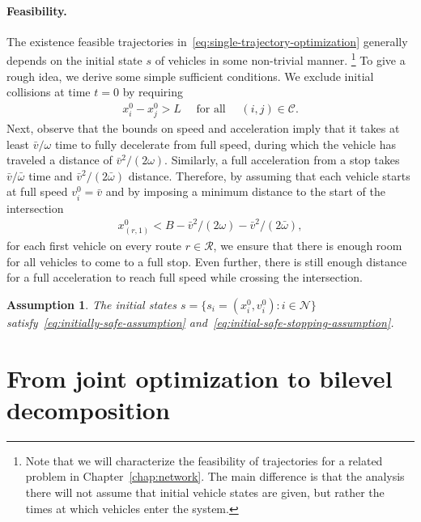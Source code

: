 \documentclass[a4paper]{report}
\theoremstyle{definition}
\theoremstyle{plain}
\newtheorem{assump}{Assumption}[chapter]
\begin{document}
\paragraph{Feasibility.}
The existence feasible trajectories in~\eqref{eq:single-trajectory-optimization} generally depends on the initial
state $s$ of vehicles in some non-trivial manner.%
\footnote{Note that we will characterize the feasibility of
  trajectories for a related problem in Chapter~\ref{chap:network}.
%
  The main difference is that the analysis there will not assume that initial
  vehicle states are given, but rather the times at which vehicles enter the
  system.}
%
To give a rough idea, we derive some simple sufficient conditions.
We exclude initial collisions at time $t=0$ by requiring
\begin{align}\label{eq:initially-safe-assumption}
 x_{i}^{0} - x_{j}^{0} > L \quad \text{ for all } \quad  (i,j) \in \mathcal{C} .
\end{align}
%
%
Next, observe that the bounds on speed and acceleration imply that it takes at
least $\bar{v}/\omega$ time to fully decelerate from full speed, during which the
vehicle has traveled a distance of $\bar{v}^2/(2\omega)$. Similarly, a full
acceleration from a stop takes $\bar{v}/\bar{\omega}$ time and
$\bar{v}^2/(2\bar{\omega})$ distance.
%
Therefore, by assuming that each vehicle starts at full speed
$v_{i}^{0} = \bar{v}$ and by imposing a minimum distance to the start of the
intersection
\begin{align}\label{eq:initial-safe-stopping-assumption}
  x_{(r,1)}^{0} < B - \bar{v}^2/(2\omega) - \bar{v}^2/(2\bar{\omega}),
\end{align}
for each first vehicle on every route
$r \in \mathcal{R}$, we ensure that there is enough room for all vehicles to
come to a full stop. Even further, there is still enough distance for a full
acceleration to reach full speed while crossing the intersection.
%

\begin{assump}\label{assump:feasible}
  The initial states $s=\{s_i = (x_i^0,v_i^0) : i \in \mathcal{N} \}$
  satisfy~\eqref{eq:initially-safe-assumption}
  and~\eqref{eq:initial-safe-stopping-assumption}.
\end{assump}


\pagebreak
\section{From joint optimization to bilevel decomposition}
\end{document}
